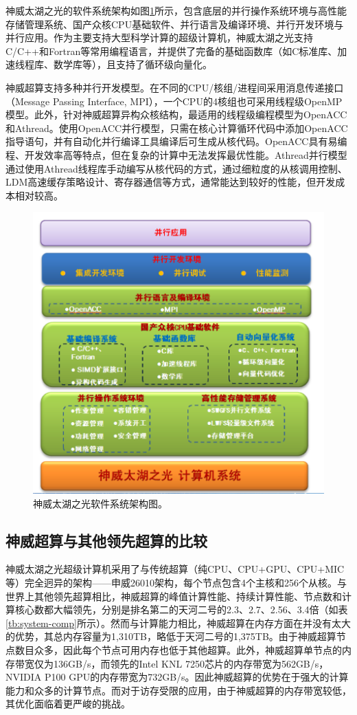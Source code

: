 \documentclass[degree=doctor]{thuthesis}
\begin{document}
神威太湖之光的软件系统架构如图\ref{fig:sunwaysofts}所示，包含底层的并行操作系统环境与高性能存储管理系统、国产众核CPU基础软件、并行语言及编译环境、并行开发环境与并行应用。作为主要支持大型科学计算的超级计算机，神威太湖之光支持C/C++和Fortran等常用编程语言，并提供了完备的基础函数库（如C标准库、加速线程库、数学库等），且支持了循环级向量化。

神威超算支持多种并行开发模型。在不同的CPU/核组/进程间采用消息传递接口（Message Passing Interface, MPI），一个CPU的4核组也可采用线程级OpenMP模型。此外，针对神威超算异构众核结构，最适用的线程级编程模型为OpenACC和Athread。使用OpenACC并行模型，只需在核心计算循环代码中添加OpenACC指导语句，并有自动化并行编译工具编译后可生成从核代码。OpenACC具有易编程、开发效率高等特点，但在复杂的计算中无法发挥最优性能。Athread并行模型通过使用Athread线程库手动编写从核代码的方式，通过细粒度的从核调用控制、LDM高速缓存策略设计、寄存器通信等方式，通常能达到较好的性能，但开发成本相对较高。

\begin{figure}[ht]
\centering
\includegraphics[width=.8\columnwidth]{sunwaysofts.png}
\caption{神威太湖之光软件系统架构图。}
\label{fig:sunwaysofts}
\end{figure}

\subsection{神威超算与其他领先超算的比较}

神威太湖之光超级计算机采用了与传统超算（纯CPU、CPU+GPU、CPU+MIC等）完全迥异的架构——申威26010架构，每个节点包含4个主核和256个从核。与世界上其他领先超算相比，神威超算的峰值计算性能、持续计算性能、节点数和计算核心数都大幅领先，分别是排名第二的天河二号的2.3、2.7、2.56、3.4倍（如表\ref{tb:system-comp}所示）。然而与计算能力相比，神威超算在内存方面在并没有太大的优势，其总内存容量为1,310TB，略低于天河二号的1,375TB。由于神威超算节点数目众多，因此每个节点可用内存也低于其他超算。此外，神威超算单节点的内存带宽仅为136GB/s，而领先的Intel KNL 7250芯片的内存带宽为562GB/s，NVIDIA P100 GPU的内存带宽为732GB/s。因此神威超算的优势在于强大的计算能力和众多的计算节点。而对于访存受限的应用，由于神威超算的内存带宽较低，其优化面临着更严峻的挑战。
\end{document}
